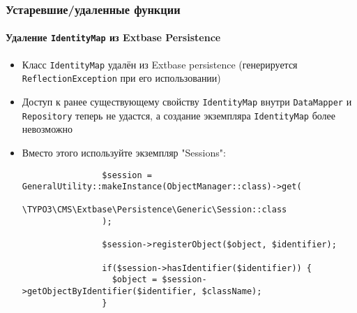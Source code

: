 \begin{frame}[fragile]
	\frametitle{Устаревшие/удаленные функции}
	\framesubtitle{Удаление \texttt{IdentityMap} из Extbase Persistence}

	\lstset{basicstyle=\tiny\ttfamily}

	\begin{itemize}

		\item Класс \texttt{IdentityMap} удалён из Extbase persistence\newline
			\small(генерируется \texttt{ReflectionException} при его использовании)\normalsize

		\item Доступ к ранее существующему свойству \texttt{IdentityMap} внутри
			\texttt{DataMapper} и \texttt{Repository} теперь не удастся, а создание экземпляра 
			\texttt{IdentityMap} более невозможно

		\item Вместо этого используйте экземпляр "Sessions":

			\begin{lstlisting}
				$session = GeneralUtility::makeInstance(ObjectManager::class)->get(
				  \TYPO3\CMS\Extbase\Persistence\Generic\Session::class
				);

				$session->registerObject($object, $identifier);

				if($session->hasIdentifier($identifier)) {
				  $object = $session->getObjectByIdentifier($identifier, $className);
				}
			\end{lstlisting}

	\end{itemize}

\end{frame}



